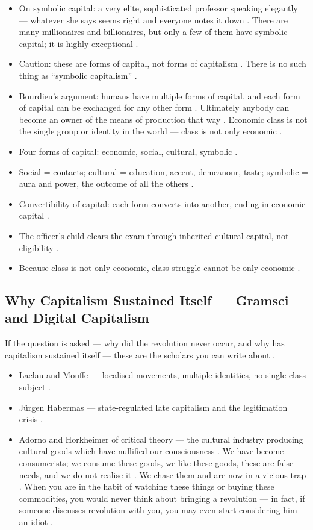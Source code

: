 \begin{itemize}
    \item On symbolic capital: a very elite, sophisticated professor speaking elegantly --- whatever she says seems right and everyone notes it down . There are many millionaires and billionaires, but only a few of them have symbolic capital; it is highly exceptional .
    \item Caution: these are forms of capital, not forms of capitalism . There is no such thing as ``symbolic capitalism'' .
    \item Bourdieu's argument: humans have multiple forms of capital, and each form of capital can be exchanged for any other form . Ultimately anybody can become an owner of the means of production that way . Economic class is not the single group or identity in the world --- class is not only economic .
\end{itemize}

\begin{QuickRevision}
\begin{itemize}
    \item Four forms of capital: economic, social, cultural, symbolic .
    \item Social = contacts; cultural = education, accent, demeanour, taste; symbolic = aura and power, the outcome of all the others .
    \item Convertibility of capital: each form converts into another, ending in economic capital .
    \item The officer's child clears the exam through inherited cultural capital, not eligibility .
    \item Because class is not only economic, class struggle cannot be only economic .
\end{itemize}
\end{QuickRevision}

\subsection{Why Capitalism Sustained Itself --- Gramsci and Digital Capitalism}
If the question is asked --- why did the revolution never occur, and why has capitalism sustained itself --- these are the scholars you can write about .
\begin{itemize}
    \item Laclau and Mouffe --- localised movements, multiple identities, no single class subject .
    \item J\"urgen Habermas --- state-regulated late capitalism and the legitimation crisis .
    \item Adorno and Horkheimer of critical theory --- the cultural industry producing cultural goods which have nullified our consciousness . We have become consumerists; we consume these goods, we like these goods, these are false needs, and we do not realise it . We chase them and are now in a vicious trap . When you are in the habit of watching these things or buying these commodities, you would never think about bringing a revolution --- in fact, if someone discusses revolution with you, you may even start considering him an idiot .
\end{itemize}


